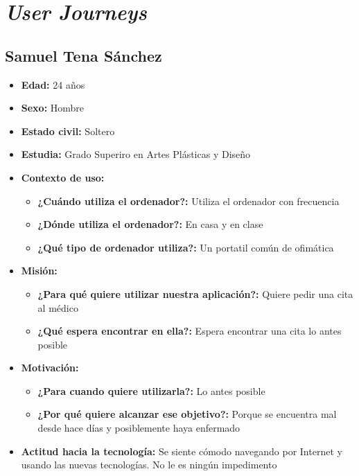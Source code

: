 \section{\textit{User Journeys}}\label{anexo}

\subsection{Samuel Tena Sánchez}
\begin{itemize}
    \item \textbf{Edad: } 24 años
    \item \textbf{Sexo: } Hombre
    \item \textbf{Estado civil: } Soltero
    \item \textbf{Estudia: } Grado Superiro en Artes Plásticas y Diseño
    \item \textbf{Contexto de uso: } 
    \begin{itemize}
        \item \textbf{¿Cuándo utiliza el ordenador?: }  Utiliza el ordenador con frecuencia
        \item \textbf{¿Dónde utiliza el ordenador?: } En casa y en clase 
        \item \textbf{¿Qué tipo de ordenador utiliza?: } Un portatil común de ofimática
    \end{itemize}
    \item \textbf{Misión: } 
    \begin{itemize}
        \item \textbf{¿Para qué quiere utilizar nuestra aplicación?: } Quiere pedir una cita al médico
        \item \textbf{¿Qué espera encontrar en ella?: } Espera encontrar una cita lo antes posible 
    \end{itemize}
    \item \textbf{Motivación: } 
    \begin{itemize}
        \item \textbf{¿Para cuando quiere utilizarla?: } Lo antes posible
        \item \textbf{¿Por qué quiere alcanzar ese objetivo?: } Porque se encuentra mal desde hace días y posiblemente haya enfermado
    \end{itemize}
    \item \textbf{Actitud hacia la tecnología: } Se siente cómodo navegando por Internet y usando las nuevas tecnologías. No le es ningún impedimento
\end{itemize}

